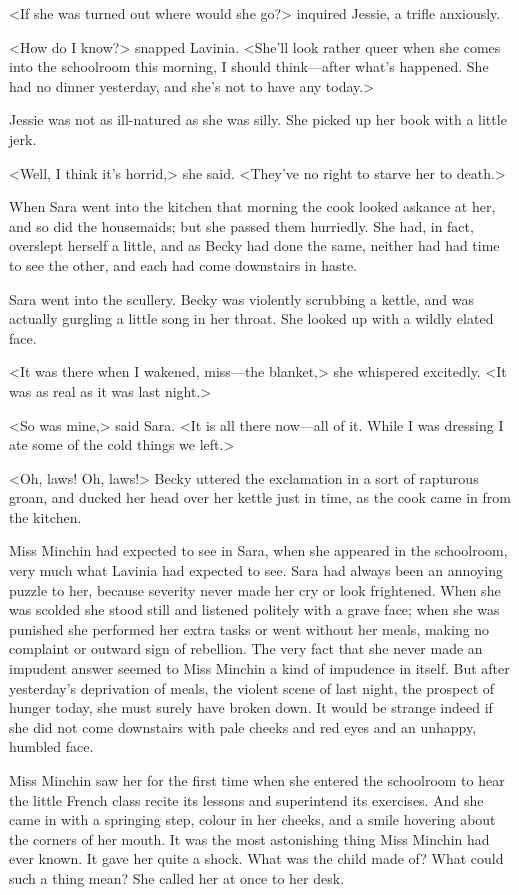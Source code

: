 <If she was turned out where would she go?> inquired Jessie, a trifle anxiously.

<How do I know?> snapped Lavinia. <She'll look rather queer when she comes into the schoolroom this morning, I should think—after what's happened. She had no dinner yesterday, and she's not to have any today.>

Jessie was not as ill-natured as she was silly. She picked up her book with a little jerk.

<Well, I think it's horrid,> she said. <They've no right to starve her to death.>

When Sara went into the kitchen that morning the cook looked askance at her, and so did the housemaids; but she passed them hurriedly. She had, in fact, overslept herself a little, and as Becky had done the same, neither had had time to see the other, and each had come downstairs in haste.

Sara went into the scullery. Becky was violently scrubbing a kettle, and was actually gurgling a little song in her throat. She looked up with a wildly elated face.

<It was there when I wakened, miss—the blanket,> she whispered excitedly. <It was as real as it was last night.>

<So was mine,> said Sara. <It is all there now—all of it. While I was dressing I ate some of the cold things we left.>

<Oh, laws! Oh, laws!> Becky uttered the exclamation in a sort of rapturous groan, and ducked her head over her kettle just in time, as the cook came in from the kitchen.

Miss Minchin had expected to see in Sara, when she appeared in the schoolroom, very much what Lavinia had expected to see. Sara had always been an annoying puzzle to her, because severity never made her cry or look frightened. When she was scolded she stood still and listened politely with a grave face; when she was punished she performed her extra tasks or went without her meals, making no complaint or outward sign of rebellion. The very fact that she never made an impudent answer seemed to Miss Minchin a kind of impudence in itself. But after yesterday's deprivation of meals, the violent scene of last night, the prospect of hunger today, she must surely have broken down. It would be strange indeed if she did not come downstairs with pale cheeks and red eyes and an unhappy, humbled face.

Miss Minchin saw her for the first time when she entered the schoolroom to hear the little French class recite its lessons and superintend its exercises. And she came in with a springing step, colour in her cheeks, and a smile hovering about the corners of her mouth. It was the most astonishing thing Miss Minchin had ever known. It gave her quite a shock. What was the child made of? What could such a thing mean? She called her at once to her desk.

